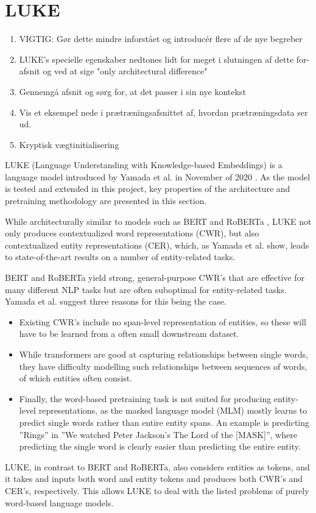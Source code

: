 \documentclass[main.tex]{subfiles}
\begin{document}
\section{LUKE}
\label{sec:LUKE}
\begin{enumerate}
    \item VIGTIG: Gør dette mindre inforstået og introducér flere af de nye begreber
    \item LUKE's specielle egenskaber nedtones lidt for meget i slutningen af dette for-afsnit og ved at sige "only architectural difference"
    \item Gennemgå afsnit og sørg for, at det passer i sin nye kontekst
    \item Vis et eksempel nede i prætræningsafsnittet af, hvordan prætræningsdata ser ud.
    \item Kryptisk vægtinitialisering
\end{enumerate}
LUKE (Language Understanding with Knowledge-based Embeddings) is a language model introduced by Yamada et al. in November of 2020 \cite{yamada2020luke}.
As the model is tested and extended in this project, key properties of the architecture and pretraining methodology are presented in this section.

While architecturally similar to models such as BERT \cite{devlin2019bert} and RoBERTa \cite{liu2019roberta}, LUKE not only produces contextualized word representations (CWR), but also contextualized entity representations (CER), which, as Yamada et al. show, leads to state-of-the-art results on a number of entity-related tasks.

BERT \cite{devlin2019bert} and RoBERTa \cite{liu2019roberta} yield strong, general-purpose CWR's that are effective for many different NLP tasks but are often suboptimal for entity-related tasks.
Yamada et al. suggest three reasons for this being the case.
\begin{itemize}
    \item Existing CWR's include no span-level representation of entities, so these will have to be learned from a often small downstream dataset.
    \item While transformers are good at capturing relationships between single words, they have difficulty modelling such relationships between sequences of words, of which entities often consist.
    \item Finally, the word-based pretraining task is not suited for producing entity-level representations, as the masked language model (MLM) mostly learns to predict single words rather than entire entity spans.
        An example is predicting ''Rings'' in ''We watched Peter Jackson's The Lord of the [MASK]'', where predicting the single word is clearly easier than predicting the entire entity.
\end{itemize}
LUKE, in contrast to BERT and RoBERTa, also considers entities as tokens, and it takes and inputs both word and entity tokens and produces both CWR's and CER's, respectively.
This allows LUKE to deal with the listed problems of purely word-based language models.
\end{document}
